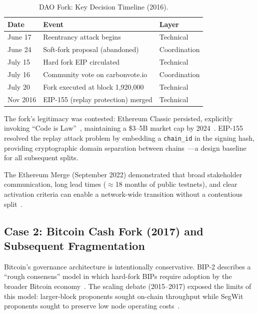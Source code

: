 \documentclass[sigconf,nonacm]{acmart}
\begin{document}
\begin{table}[h]
\caption{DAO Fork: Key Decision Timeline (2016).}
\label{tab:dao-timeline}
\small
\begin{tabularx}{\columnwidth}{@{}lXl@{}}
\toprule
\textbf{Date} & \textbf{Event} & \textbf{Layer} \\
\midrule
June 17  & Reentrancy attack begins          & Technical    \\
June 24  & Soft-fork proposal (abandoned)    & Coordination \\
July 15  & Hard fork EIP circulated          & Technical    \\
July 16  & Community vote on carbonvote.io   & Coordination \\
July 20  & Fork executed at block 1,920,000  & Technical    \\
Nov 2016 & EIP-155 (replay protection) merged & Technical   \\
\bottomrule
\end{tabularx}
\end{table}

The fork's legitimacy was contested: Ethereum Classic persisted, explicitly invoking
``Code is Law''~\cite{etc-codeislaw}, maintaining a \$3--5B market cap by
2024~\cite{coinmarketcap2024}. EIP-155 resolved the replay attack problem by embedding
a \texttt{chain\_id} in the signing hash, providing cryptographic domain separation
between chains~\cite{eip155}---a design baseline for all subsequent splits.

The Ethereum Merge (September 2022) demonstrated that broad stakeholder communication,
long lead times ($\approx$18 months of public testnets), and clear activation criteria
can enable a network-wide transition without a contentious
split~\cite{ethereum-merge2022}.

\subsection{Case 2: Bitcoin Cash Fork (2017) and Subsequent Fragmentation}
\label{sec:bch}

Bitcoin's governance architecture is intentionally conservative. BIP-2 describes a
``rough consensus'' model in which hard-fork BIPs require adoption by the broader Bitcoin
economy~\cite{bip2}. The scaling debate (2015--2017) exposed the limits of this model:
larger-block proponents sought on-chain throughput while SegWit proponents sought to
preserve low node operating costs~\cite{bip141,bip2}.
\end{document}
